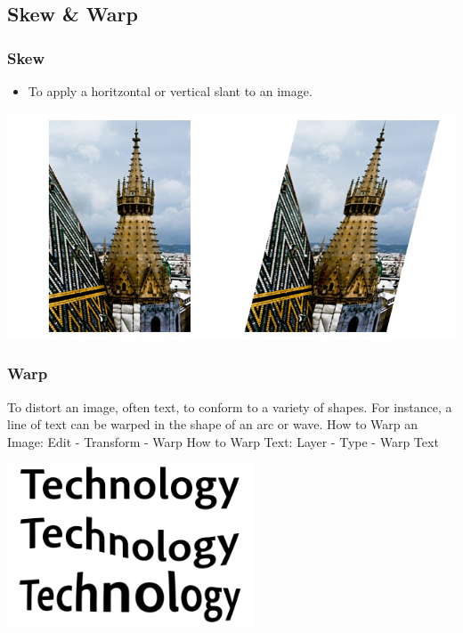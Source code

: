 \documentclass{beamer}
\begin{document}
		\subsection{Skew \& Warp}
\begin{frame}
	\frametitle{Skew}
	\begin{itemize}
		\item To apply a horitzontal or vertical slant to an image.
	\end{itemize}
	\begin{center}
		\includegraphics[width = 1.0\textwidth]{images/skew.jpg}
	\end{center}
\end{frame}

\begin{frame}
	\frametitle{Warp}
	\begin{outline}
		\1 To distort an image, often text, to conform to a variety of shapes. For instance, a line of text can be warped in the shape of an arc or wave.
		\1 How to Warp an Image:
		\2 Edit - Transform - Warp 
		\1 How to Warp Text:
		\2 Layer - Type - Warp Text
	\end{outline}
	\begin{center}
		\includegraphics[width = 0.55\textwidth]{images/warp.png}
	\end{center}
\end{frame}
\end{document}
